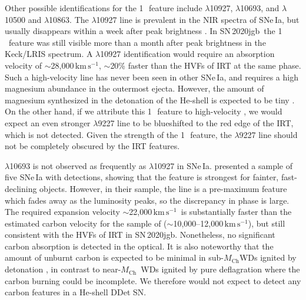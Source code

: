 \documentclass[twocolumn]{aastex631}
\newcommand{\sn}{SN\,2020jgb}
\newcommand{\Mch}{$M_\mathrm{Ch}$}
\newcommand{\kms}{$\mathrm{km}\,\mathrm{s}^{-1}$}
\begin{document}
\begin{CJK*}{UTF8}{gbsn}
Other possible identifications for the 1\,\micron\ feature include  $\lambda$10927,  $\lambda$10693, and  $\lambda$10500 and $\lambda$10863. The  $\lambda$10927 line is prevalent in the NIR spectra of SNe\,Ia, but usually disappears within a week after peak brightness \citep{Marion2009_NIR}. In \sn\ the 1\,\micron\ feature was still visible more than a month after peak brightness in the Keck/LRIS spectrum. A  $\lambda$10927 identification would require an absorption velocity of $\sim$28,000\,\kms, $\sim$20\% faster than the HVFs of  IRT at the same phase. Such a high-velocity  line has never been seen in other SNe\,Ia, and requires a high magnesium abundance in the outermost ejecta. However, the amount of magnesium synthesized in the detonation of the He-shell is expected to be tiny \citep{Fink_DD_2010,Kromer_DD_2010,polin_observational_2019,polin_nebular_2021}. On the other hand, if we attribute this 1\,\micron\ feature to high-velocity , we would expect an even stronger  $\lambda$9227 line to be blueshifted to the red edge of the  IRT, which is not detected. Given the strength of the 1\,\micron\ feature, the  $\lambda$9227 line should not be completely obscured by the  IRT features.

 $\lambda$10693 is not observed as frequently as  $\lambda$10927 in SNe\,Ia. \citet{Hsiao_CSP_2019} presented a sample of five SNe\,Ia with  detections, showing that the  feature is strongest for fainter, fast-declining objects. However, in their sample, the  line is a pre-maximum feature which fades away as the luminosity peaks, so the discrepancy in phase is large. The required expansion velocity $\sim$22,000\,\kms\ is substantially faster than the estimated carbon velocity for the sample of \citet{Hsiao_CSP_2019} ($\sim$10,000--12,000\,\kms), but still consistent with the HVFs of  IRT in \sn. Nonetheless, no significant carbon absorption is detected in the optical. It is also noteworthy that the amount of unburnt carbon is expected to be minimal in sub-\Mch WDs ignited by detonation \citep{polin_observational_2019}, in contrast to near-\Mch\ WDs ignited by pure deflagration where the carbon burning could be incomplete. We therefore would not expect to detect any carbon features in a He-shell DDet SN.


\end{CJK*}
\end{document}
